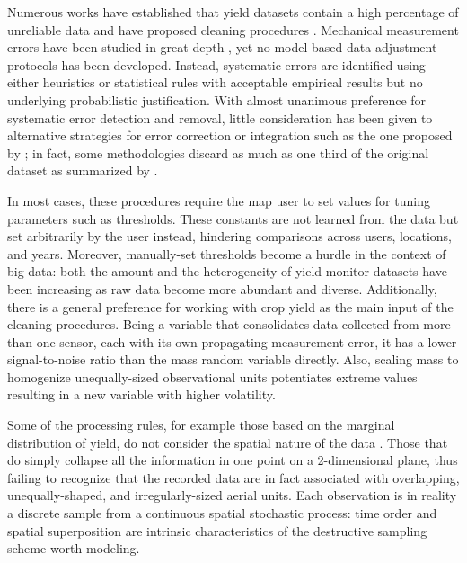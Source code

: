 Numerous works have established that yield datasets contain a high
percentage of unreliable data and have proposed cleaning procedures
\citep{Blackmore1996, Moore1998, Blackmore1999, Thylen2000, Noack2003,
  Simbahan2004, Ping2005, Sudduth2007, Sudduth2012, Spekken2013,
  Leroux2018, Leroux2019, Vega2019}. Mechanical measurement errors
have been studied in great depth \citep{Arslan1999, Arslan2002,
  Grisso2002, Burks2004, Hemming2005, Fulton2009, Schuster2017}, yet
no model-based data adjustment protocols has been developed. Instead,
systematic errors are identified using either heuristics or
statistical rules with acceptable empirical results but no underlying
probabilistic justification. With almost unanimous preference for
systematic error detection and removal, little consideration has been
given to alternative strategies for error correction or integration
such as the one proposed by \cite{Bachmaier2007, Bachmaier2010}; in
fact, some methodologies discard as much as one third of the original
dataset as summarized by \cite{Lyle2013}.

In most cases, these procedures require the map user to set values for
tuning parameters such as thresholds. These constants are not learned
from the data but set arbitrarily by the user instead, hindering
comparisons across users, locations, and years. Moreover, manually-set
thresholds become a hurdle in the context of big data: both the amount
and the heterogeneity of yield monitor datasets have been increasing
as raw data become more abundant and diverse. Additionally, there is a
general preference for working with crop yield as the main input of
the cleaning procedures. Being a variable that consolidates data
collected from more than one sensor, each with its own propagating
measurement error, it has a lower signal-to-noise ratio than the mass
random variable directly. Also, scaling mass to homogenize
unequally-sized observational units potentiates extreme values
resulting in a new variable with higher volatility.

Some of the processing rules, for example those based on the marginal
distribution of yield, do not consider the spatial nature of the data
. Those that do simply collapse all the information
in one point on a 2-dimensional plane, thus failing to recognize that
the recorded data are in fact associated with overlapping,
unequally-shaped, and irregularly-sized aerial units. Each observation
is in reality a discrete sample from a continuous spatial stochastic
process: time order and spatial superposition are intrinsic
characteristics of the destructive sampling scheme worth modeling.

